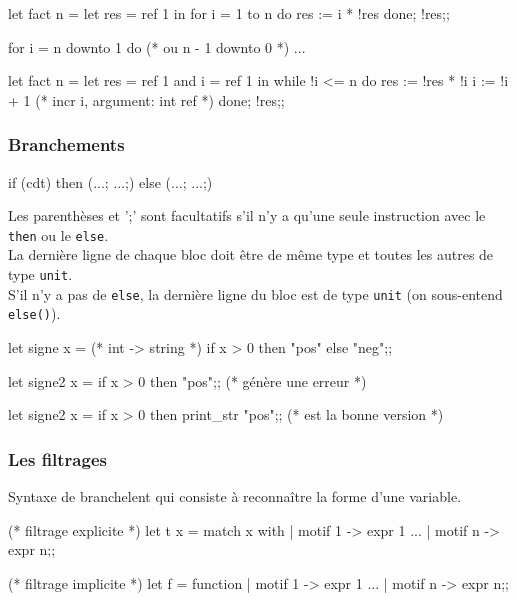 \documentclass{article}
\newcommand{\code}[1]{\lstinline[style = mystyle]{#1}}
\begin{document}
				\begin{case}
let fact n =
	let res = ref 1 in
		for i = 1 to n do
			res := i * !res
		done; !res;;

for i = n downto 1 do (* ou n - 1 downto 0 *)
	...
	
let fact n =
	let res = ref 1 and i = ref 1 in
		while !i <= n do
			res := !res * !i
			i := !i + 1 (* incr i, argument: int ref *)
		done; !res;;
				\end{case}
			
		\subsubsection{Branchements}
		
			\begin{case}
if (cdt) then
	(...;
	 ...;)
else
	(...;
	 ...;)
			\end{case}
			
			Les parenthèses et ';' sont facultatifs s'il n'y a qu'une seule instruction avec le \code{then} ou le \code{else}.\\ %
			La dernière ligne de chaque bloc doit être de même type et toutes les autres de type \code{unit}.\\
			S'il n'y a pas de \code{else}, la dernière ligne du bloc est de type \code{unit} (on sous-entend \code{else()}).
			
			\begin{case}
let signe x = (* int -> string *)
	if x > 0 then "pos"
	else "neg";;

let signe2 x =
	if x > 0 then "pos";; (* génère une erreur *)

let signe2 x =
	if x > 0 then print_str "pos";; (* est la bonne version *)
			\end{case}
			
		\subsubsection{Les filtrages}
		
			Syntaxe de branchelent qui consiste à reconnaître la forme d'une variable.
			
			\begin{case}
(* filtrage explicite *)
let t x = match x with
| motif 1 -> expr 1
...
| motif n -> expr n;;

(* filtrage implicite *)
let f = function
| motif 1 -> expr 1
...
| motif n -> expr n;;
			\end{case}
			
\end{document}
